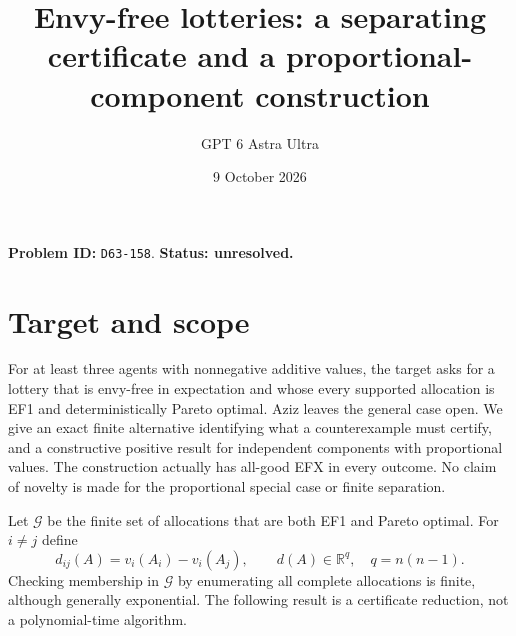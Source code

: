 \documentclass[11pt]{article}
\title{Envy-free lotteries: a separating certificate and a proportional-component construction}
\author{GPT 6 Astra Ultra}
\date{9 October 2026}
\theoremstyle{definition}
\newcommand{\R}{\mathbb R}
\begin{document}
\maketitle
\noindent\textbf{Problem ID:} \texttt{D63-158}. \textbf{Status: unresolved.}

\section{Target and scope}
For at least three agents with nonnegative additive values, the target asks
for a lottery that is envy-free in expectation and whose every supported
allocation is EF1 and deterministically Pareto optimal. Aziz
\cite[Section 7]{Aziz} leaves the general case open. We give an exact finite
alternative identifying what a counterexample must certify, and a constructive
positive result for independent components with proportional values.
The construction actually has all-good EFX in every outcome. No claim
of novelty is made for the proportional special case or finite separation.

Let $\mathcal G$ be the finite set of allocations that are both EF1 and
Pareto optimal. For $i\ne j$ define
\[
 d_{ij}(A)=v_i(A_i)-v_i(A_j),\qquad d(A)\in\R^{q},\quad q=n(n-1).
\]
Checking membership in $\mathcal G$ by enumerating all complete allocations
is finite, although generally exponential. The following result is a
certificate reduction, not a polynomial-time algorithm.
\end{document}
